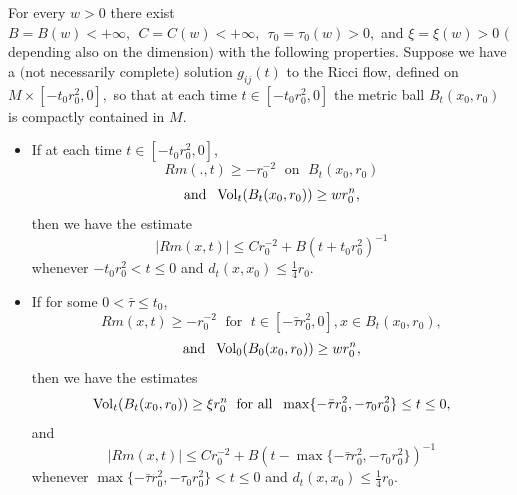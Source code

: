 \begin{theorem}
  \label{thm:cz-local-volume-growth-curvature-estimate}

For every $w>0$ there exist $B=B(w)<+\infty,\ \ C=C(w)<+\infty, \
\ \tau_0=\tau_0(w)>0,$ and $\xi=\xi(w)>0$ $($depending also on the
dimension$)$ with the following properties. Suppose we have a
$($not necessarily complete$)$ solution $g_{ij}(t)$ to the Ricci
flow, defined on $M\times[-t_0r_0^2,0],$ so that at each time
$t\in [-t_0r_0^2,0]$ the metric ball $B_t(x_0,r_0)$ is compactly
contained in $M.$
\begin{itemize}
\item[(i)] If at each time $t \in [-t_0r_0^2,0]$,
$$
Rm(.,t)\geq -r_0^{-2} \; \mbox{ on }\; B_t(x_0,r_0)
$$
$$
\mbox{and } \; \operatorname{Vol}_t(B_t(x_0,r_0))\geq wr_0^n,
$$
then we have the estimate
$$
|Rm(x,t)|\leq Cr_0^{-2}+B(t+t_0r_0^2)^{-1}
$$
whenever $-t_0r_0^2 < t\leq 0$ and $d_t(x,x_0)\leq
\frac{1}{4}r_0.$ \item[(ii)] If for some $0 < \bar{\tau} \leq
t_0$,
$$
Rm(x,t)\geq -r_0^{-2} \; \mbox{ for }\; t\in [-\bar{\tau}
r_0^2,0], x\in B_t(x_0,r_0),
$$
$$
\mbox{and } \; \operatorname{Vol}_0(B_0(x_0,r_0))\geq wr_0^n,
$$
then we have the estimates
$$
\operatorname{Vol}_t(B_t(x_0,r_0))\geq \xi r_0^n\; \mbox{ for all }\;
\max\{-\bar{\tau}r_0^2,-\tau_0r_0^2\}   \leq t \leq 0,
$$
and
$$
|Rm(x,t)|\leq Cr_0^{-2}+B(t -\max\{-\bar{\tau}r_0^2,-\tau_0r_0^2\}
)^{-1}
$$
whenever $\max\{-\bar{\tau}r_0^2,-\tau_0r_0^2\} < t\leq 0$ and
$d_t(x,x_0)\leq \frac{1}{4}r_0.$
\end{itemize}
\end{theorem}

